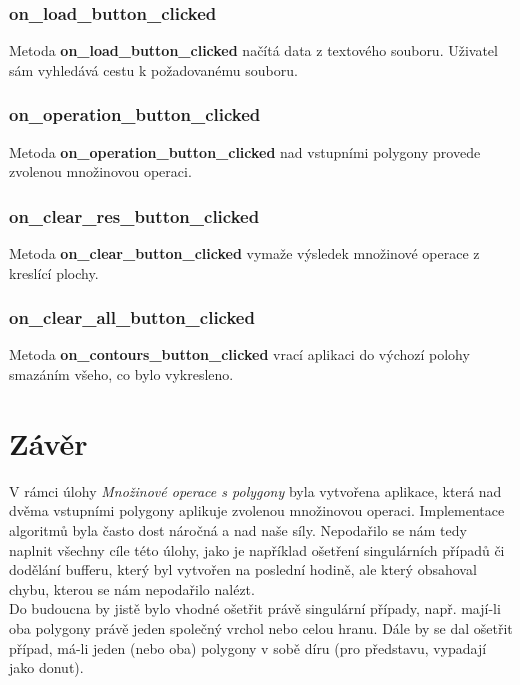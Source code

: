 \documentclass[a4paper, 12pt]{article}
\begin{document}
\subsubsection*{on\_load\_button\_clicked}
Metoda \textbf{on\_load\_button\_clicked} načítá data z textového souboru. Uživatel sám vyhledává cestu k požadovanému souboru.

\subsubsection*{on\_operation\_button\_clicked}
Metoda \textbf{on\_operation\_button\_clicked} nad vstupními polygony provede zvolenou mno\-ži\-no\-vou operaci.

\subsubsection*{on\_clear\_res\_button\_clicked}
Metoda \textbf{on\_clear\_button\_clicked} vymaže výsledek množinové operace z kreslící plochy. 

\subsubsection*{on\_clear\_all\_button\_clicked}
Metoda \textbf{on\_contours\_button\_clicked} vrací aplikaci do výchozí polohy smazáním všeho, co bylo vykresleno. 



\clearpage
\section{Závěr}
V rámci úlohy \textit{Množinové operace s polygony} byla vytvořena aplikace, která nad dvěma vstupními polygony aplikuje zvolenou množinovou operaci. Implementace algoritmů byla často dost náročná a nad naše síly. Nepodařilo se nám tedy naplnit všechny cíle této úlohy, jako je například ošetření singulárních případů či dodělání bufferu, který byl vytvořen na poslední hodině, ale který obsahoval chybu, kterou se nám nepodařilo nalézt.\\

Do budoucna by jistě bylo vhodné ošetřit právě singulární případy, např. mají-li oba polygony právě jeden společný vrchol nebo celou hranu. Dále by se dal ošetřit případ, má-li jeden (nebo oba) polygony v sobě díru (pro představu, vypadají jako donut).
\clearpage
\end{document}
